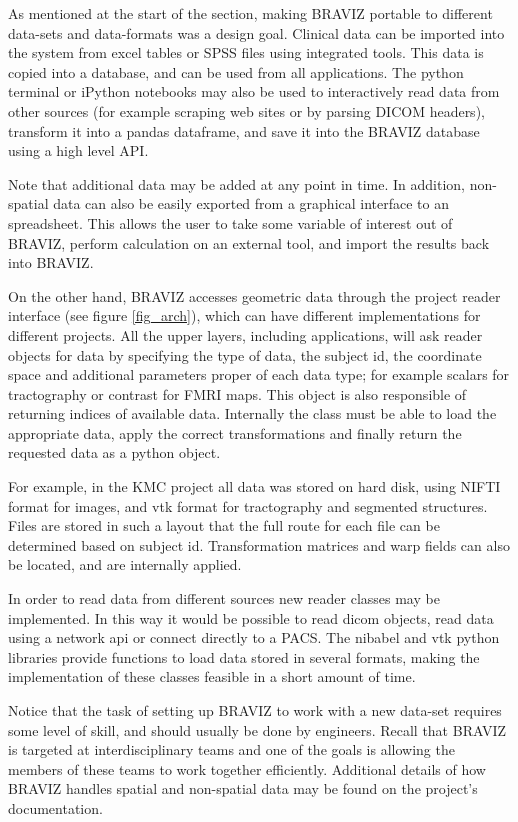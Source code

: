 \documentclass[twocolumn]{svjour3}
\begin{document}

As mentioned at the start of the section, making BRAVIZ portable to different data-sets and data-formats was a design goal. Clinical data can be imported into the system from excel tables or SPSS files using integrated tools. This data is copied into a database, and can be used from all applications. The python terminal or iPython notebooks \cite{perez_ipython:_2007} may also be used to interactively read data from other sources (for example scraping web sites or by parsing DICOM headers), transform it into a pandas dataframe, and save it into the BRAVIZ database using a high level API.

Note that additional data may be added at any point in time. In addition, non-spatial data can also be easily exported from a graphical interface to an spreadsheet. This allows the user to take some variable of interest out of BRAVIZ, perform calculation on an external tool, and import the results back into BRAVIZ.

On the other hand, BRAVIZ accesses geometric data through the project reader interface (see figure \ref{fig_arch}), which can have different implementations for different projects. All the upper layers, including applications, will ask reader objects for data by specifying the type of data, the subject id, the coordinate space  and additional parameters proper of each data type; for example scalars for tractography or contrast for FMRI maps. This object is also responsible of returning indices of available data. Internally the class must be able to load the appropriate data, apply the correct transformations and finally return the requested data as a python object. 

For example, in the KMC project all data was stored on hard disk, using NIFTI format for images, and vtk format for tractography and segmented structures. Files are stored in such a layout that the full route for each file can be determined based on subject id. Transformation matrices and warp fields can also be located, and are internally applied.

In order to read data from different sources new reader classes may be implemented. In this way it would be possible to read dicom objects, read data using a network api or connect directly to a PACS. The nibabel and vtk python libraries provide functions to load data stored in several formats, making the implementation of these classes feasible in a short amount of time.

Notice that the task of setting up BRAVIZ to work with a new data-set requires some level of skill, and should usually be done by engineers. Recall that BRAVIZ is targeted at interdisciplinary teams and one of the goals is allowing the members of these teams to work together efficiently. Additional details of how BRAVIZ handles spatial and non-spatial data may be found on the project's documentation. 
\end{document}
